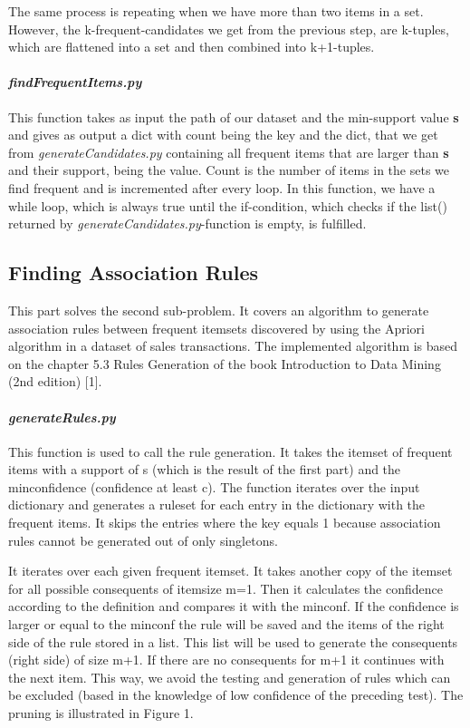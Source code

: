 \documentclass[a4paper, 11pt]{article}
\begin{document}
The same process is repeating when we have more than two items in a set. However, the k-frequent-candidates we get from the previous step, are k-tuples, which are flattened into a set and then combined into k+1-tuples.




\paragraph{\textit{findFrequentItems.py}}
This function takes as input the path of our dataset and the min-support value \textbf{s} and gives as output a dict with count being the key and the dict, that we get from \textit{generateCandidates.py} containing all frequent items that are larger than \textbf{s} and their support, being the value. Count is the number of items in the sets we find frequent and is incremented after every loop. In this function, we have a while loop, which is always true until the if-condition, which checks if the list() returned by \textit{generateCandidates.py}-function is empty, is fulfilled. 

\subsection{Finding Association Rules}
This part solves the second sub-problem. It covers an algorithm to generate association rules between frequent itemsets discovered by using the Apriori algorithm in a dataset of sales transactions. 
The implemented algorithm is based on the chapter 5.3 Rules Generation of the book Introduction to Data Mining (2nd edition) [1]. 


\paragraph{\textit{generateRules.py}}
This function is used to call the rule generation. It takes the itemset of frequent items with a support of s (which is the result of the first part) and the minconfidence (confidence at least c). 
The function iterates over the input dictionary and generates a ruleset for each entry in the dictionary with the frequent items. It skips the entries where the key equals 1 because association rules cannot be generated out of only singletons. 

It iterates over each given frequent itemset. It takes another copy of the itemset for all possible consequents of itemsize m=1. Then it calculates the confidence according to the definition and compares it with the minconf. If the confidence is larger or equal to the minconf the rule will be saved and the items of the right side of the rule stored in a list. This list will be used to generate the consequents (right side) of size m+1. If there are no consequents for m+1 it continues with the next item.
This way, we avoid the testing and generation of rules which can be excluded (based in the knowledge of low confidence of the preceding test). The pruning is illustrated in Figure 1. 
\end{document}
